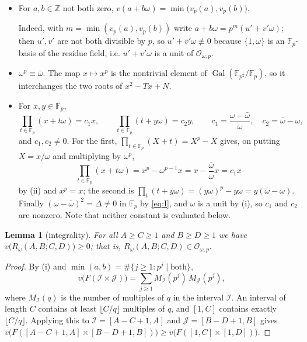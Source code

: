 \documentclass[11pt]{amsart}
\newtheorem{lemma}[theorem]{Lemma}
\theoremstyle{remark}
\newcommand{\OO}{\mathcal{O}}
\newcommand{\Rw}{R_{\omega}}
\newcommand{\Fp}{\mathbb{F}_p}
\newcommand{\ZZ}{\mathbb{Z}}
\begin{document}
\begin{itemize}
\item[(i)] For $a,b\in\ZZ$ not both zero,
  $v(a+b\omega)=\min\bigl(v_p(a),v_p(b)\bigr)$.

  Indeed, with $m=\min(v_p(a),v_p(b))$ write $a+b\omega=p^{m}(u'+v'\omega)$;
  then $u',v'$ are not both divisible by $p$, so $u'+v'\omega\not\equiv0$
  because $\{1,\omega\}$ is an $\Fp$-basis of the residue field, i.e.
  $u'+v'\omega$ is a unit of $\OO_{\omega,p}$.

\item[(ii)] $\omega^{p}\equiv\bar\omega$. The map $x\mapsto x^{p}$ is the
  nontrivial element of $\operatorname{Gal}(\mathbb F_{p^{2}}/\Fp)$, so it
  interchanges the two roots of $x^{2}-Tx+N$.

\item[(iii)] For $x,y\in\Fp$,
  \[
   \prod_{t\in\Fp}(x+t\omega)=c_{1}x,
   \qquad
   \prod_{t\in\Fp}(t+y\omega)=c_{2}y,
   \qquad
   c_{1}=\frac{\omega-\bar\omega}{\omega},\quad c_{2}=\bar\omega-\omega ,
  \]
  and $c_{1},c_{2}\ne0$. For the first, $\prod_{t\in\Fp}(X+t)=X^{p}-X$
  gives, on putting $X=x/\omega$ and multiplying by $\omega^{p}$,
  \[
   \prod_{t\in\Fp}(x+t\omega)=x^{p}-\omega^{p-1}x
   =x-\frac{\bar\omega}{\omega}x=c_{1}x
  \]
  by (ii) and $x^{p}=x$; the second is
  $\prod_{t}(t+y\omega)=(y\omega)^{p}-y\omega=y(\bar\omega-\omega)$.
  Finally $(\omega-\bar\omega)^{2}=\Delta\ne0$ in $\Fp$ by \eqref{eq:I},
  and $\omega$ is a unit by (i), so $c_{1}$ and $c_{2}$ are nonzero.
  Note that neither constant is evaluated below.
\end{itemize}

\begin{lemma}[integrality]\label{lem:int}
For all $A\ge C\ge1$ and $B\ge D\ge1$ we have
$v\bigl(\Rw(A,B;C,D)\bigr)\ge0$; that is, $\Rw(A,B;C,D)\in\OO_{\omega,p}$.
\end{lemma}

\begin{proof}
By (i) and $\min(a,b)=\#\{j\ge1:p^{j}\mid\text{both}\}$,
\[
 v\bigl(F(\mathcal I\times\mathcal J)\bigr)
 =\sum_{j\ge1}M_{\mathcal I}(p^{j})\,M_{\mathcal J}(p^{j}),
\]
where $M_{\mathcal I}(q)$ is the number of multiples of $q$ in the
interval $\mathcal I$. An interval of length $C$ contains at least
$\lfloor C/q\rfloor$ multiples of $q$, and $[1,C]$ contains exactly
$\lfloor C/q\rfloor$. Applying this to $\mathcal I=[A-C+1,A]$ and
$\mathcal J=[B-D+1,B]$ gives
$v\bigl(F([A-C+1,A]\times[B-D+1,B])\bigr)\ge
 v\bigl(F([1,C]\times[1,D])\bigr)$.
\end{proof}
\end{document}

